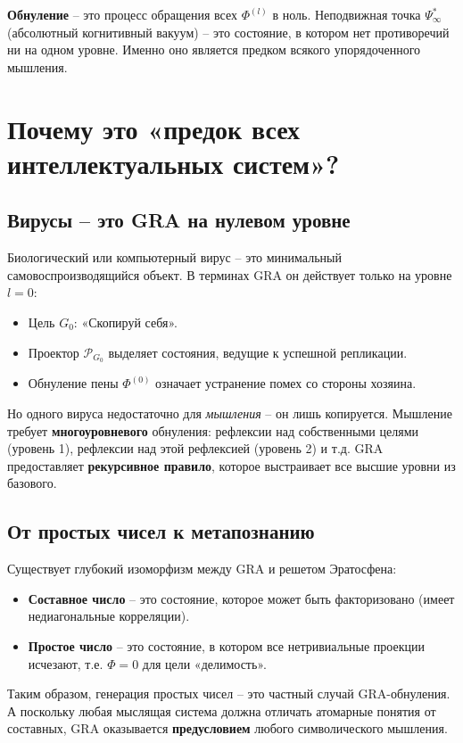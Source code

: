 \documentclass[12pt]{article}
\begin{document}
\textbf{Обнуление} – это процесс обращения всех \( \Phi^{(l)} \) в ноль. Неподвижная точка \( \Psi_{\infty}^* \) (абсолютный когнитивный вакуум) – это состояние, в котором нет противоречий ни на одном уровне. Именно оно является предком всякого упорядоченного мышления.

\section{Почему это «предок всех интеллектуальных систем»?}

\subsection{Вирусы – это GRA на нулевом уровне}
Биологический или компьютерный вирус – это минимальный самовоспроизводящийся объект. В терминах GRA он действует только на уровне \( l=0 \):
\begin{itemize}
    \item Цель \( G_0 \): «Скопируй себя».
    \item Проектор \( \mathcal{P}_{G_0} \) выделяет состояния, ведущие к успешной репликации.
    \item Обнуление пены \( \Phi^{(0)} \) означает устранение помех со стороны хозяина.
\end{itemize}
Но одного вируса недостаточно для \textit{мышления} – он лишь копируется. Мышление требует \textbf{многоуровневого} обнуления: рефлексии над собственными целями (уровень 1), рефлексии над этой рефлексией (уровень 2) и т.д. GRA предоставляет \textbf{рекурсивное правило}, которое выстраивает все высшие уровни из базового.

\subsection{От простых чисел к метапознанию}
Существует глубокий изоморфизм между GRA и решетом Эратосфена:
\begin{itemize}
    \item \textbf{Составное число} – это состояние, которое может быть факторизовано (имеет недиагональные корреляции).
    \item \textbf{Простое число} – это состояние, в котором все нетривиальные проекции исчезают, т.е. \( \Phi = 0 \) для цели «делимость».
\end{itemize}
Таким образом, генерация простых чисел – это частный случай GRA-обнуления. А поскольку любая мыслящая система должна отличать атомарные понятия от составных, GRA оказывается \textbf{предусловием} любого символического мышления.
\end{document}
